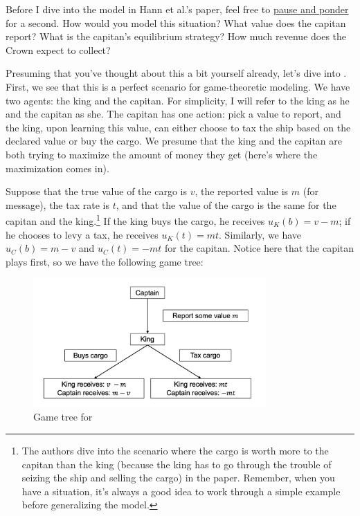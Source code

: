 Before I dive into the model in Hann et al.'s paper, feel free to \href{https://pbs.twimg.com/media/C1hNo_KUcAAJDQ9.jpg:large}{pause and ponder} for a second. How would you model this situation? What value does the capitan report? What is the capitan's equilibrium strategy? How much revenue does the Crown expect to collect?

Presuming that you've thought about this a bit yourself already, let's dive into \citet{Haan_2012_Taxation}. First, we see that this is a perfect scenario for game-theoretic modeling. We have two agents: the king and the capitan. For simplicity, I will refer to the king as he and the capitan as she. The capitan has one action: pick a value to report, and the king, upon learning this value, can either choose to tax the ship based on the declared value or buy the cargo. We presume that the king and the capitan are both trying to maximize the amount of money they get (here's where the maximization comes in). 

Suppose that the true value of the cargo is $v$, the reported value is $m$ (for message), the tax rate is $t$, and that the value of the cargo is the same for the capitan and the king.\footnote{The authors dive into the scenario where the cargo is worth more to the capitan than the king (because the king has to go through the trouble of seizing the ship and selling the cargo) in the paper. Remember, when you have a situation, it's always a good idea to work through a simple example before generalizing the model.} If the king buys the cargo, he receives $u_K(b) = v - m$; if he chooses to levy a tax, he receives $u_K(t) = mt$. Similarly, we have $u_C(b) = m - v$ and $u_C(t) = -mt$ for the capitan. Notice here that the capitan plays first, so we have the following game tree:

\begin{figure}[H]
    \caption{Game tree for \citet{Haan_2012_Taxation}}
    \centering
    \includegraphics[width = 3.5in]{taxgamertree.png}
\end{figure}

